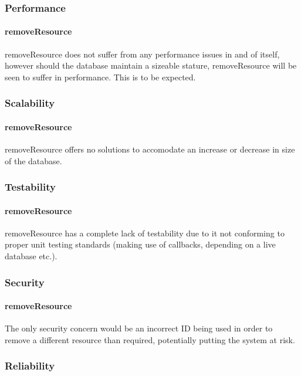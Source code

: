 \documentclass[a4paper]{article}
\begin{document}
\subsubsection {Performance}

\paragraph{removeResource}
removeResource does not suffer from any performance issues in and of itself, however should the database maintain a sizeable stature, removeResource will be seen to suffer in performance. This is to be expected.

\subsubsection {Scalability}

\paragraph{removeResource}
removeResource offers no solutions to accomodate an increase or decrease in size of the database.

\subsubsection {Testability}

\paragraph{removeResource}
removeResource has a complete lack of testability due to it not conforming to proper unit testing standards (making use of callbacks, depending on a live database etc.).

\subsubsection {Security}

\paragraph{removeResource}
The only security concern would be an incorrect ID being used in order to remove a different resource than required, potentially putting the system at risk.

\subsubsection {Reliability}
\end{document}
